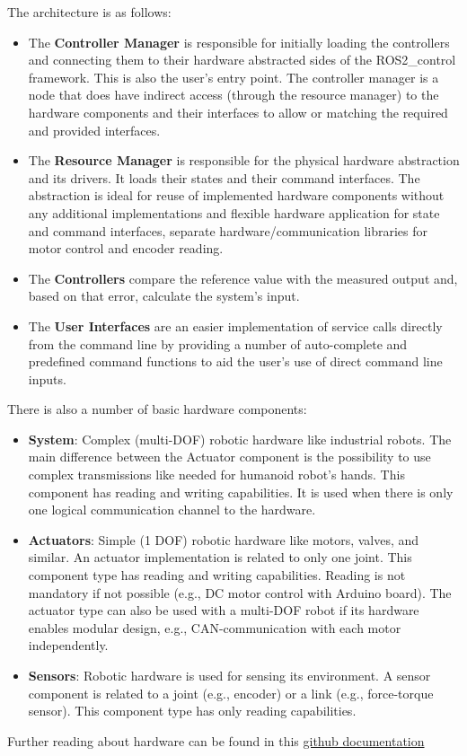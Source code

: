 \documentclass[10pt,a4paper,english]{article}
\begin{document}
The architecture is as follows:
\begin{itemize}
  \item The \textbf{Controller Manager} is responsible for initially loading the controllers and connecting them to their hardware abstracted sides of the ROS2\_control framework. This is also the user's entry point. The controller manager is a node that does have indirect access (through the resource manager) to the hardware components and their interfaces to allow or matching the required and provided interfaces.
  \item The \textbf{Resource Manager} is responsible for the physical hardware abstraction and its drivers. It loads their states and their command interfaces. The abstraction is ideal for reuse of implemented hardware components without any additional implementations and flexible hardware application for state and command interfaces, separate hardware/communication libraries for motor control and encoder reading.
  \item The \textbf{Controllers} compare the reference value with the measured output and, based on that error, calculate the system's input.
  \item The \textbf{User Interfaces} are an easier implementation of service calls directly from the command line by providing a number of auto-complete and predefined command functions to aid the user's use of direct command line inputs.
\end{itemize}

\noindent There is also a number of basic hardware components:
\begin{itemize}
  \item \textbf{System}: Complex (multi-DOF) robotic hardware like industrial robots. The main difference between the Actuator component is the possibility to use complex transmissions like needed for humanoid robot's hands. This component has reading and writing capabilities. It is used when there is only one logical communication channel to the hardware.
  \item \textbf{Actuators}: Simple (1 DOF) robotic hardware like motors, valves, and similar. An actuator implementation is related to only one joint. This component type has reading and writing capabilities. Reading is not mandatory if not possible (e.g., DC motor control with Arduino board). The actuator type can also be used with a multi-DOF robot if its hardware enables modular design, e.g., CAN-communication with each motor independently.
  \item \textbf{Sensors}: Robotic hardware is used for sensing its environment. A sensor component is related to a joint (e.g., encoder) or a link (e.g., force-torque sensor). This component type has only reading capabilities.
\end{itemize}
Further reading about hardware can be found in this \href{https://github.com/ros-controls/roadmap/blob/master/design_drafts/hardware_access.md}{github documentation}
\end{document}
